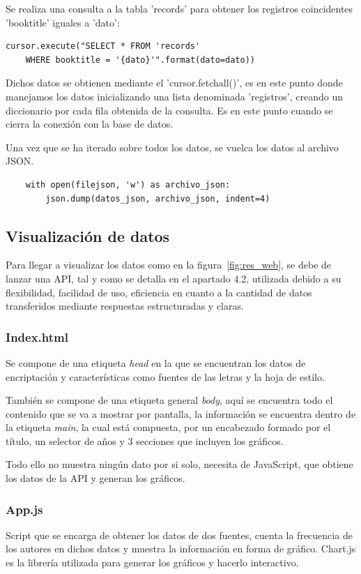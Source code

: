 \documentclass[a4paper, 12pt]{book}
\begin{document}
Se realiza una consulta a la tabla 'records' para obtener los registros coincidentes 'booktitle' iguales a 'dato':

\begin{verbatim}
cursor.execute("SELECT * FROM 'records' 
    WHERE booktitle = '{dato}'".format(dato=dato))
\end{verbatim}

Dichos datos se obtienen mediante el 'cursor.fetchall()', es en este punto donde manejamos los datos inicializando una lista denominada 'registros', creando un diccionario por cada fila obtenida de la consulta. Es en este punto cuando se cierra la conexión con la base de datos.

Una vez que se ha iterado sobre todos los datos, se vuelca los datos al archivo JSON.

\begin{verbatim}
    with open(filejson, 'w') as archivo_json:
        json.dump(datos_json, archivo_json, indent=4)
\end{verbatim}

\subsection{Visualización de datos}

Para llegar a visualizar los datos como en la figura~\ref{fig:res_web}, se debe de lanzar una API, tal y como se detalla en el apartado 4.2, utilizada debido a su flexibilidad, facilidad de uso, eficiencia en cuanto a la cantidad de datos transferidos mediante respuestas estructuradas y claras.

\subsubsection{Index.html}
Se compone de una etiqueta \textit{head} en la que se encuentran los datos de encriptación y características como fuentes de las letras y la hoja de estilo.

También se compone de una etiqueta general \textit{body}, aquí se encuentra todo el contenido que se va a mostrar por pantalla, la información se encuentra dentro de la etiqueta \textit{main}, la cual está compuesta, por un encabezado formado por el título, un selector de años y 3 secciones que incluyen los gráficos.

Todo ello no muestra ningún dato por si solo, necesita de JavaScript, que obtiene los datos de la API y generan los gráficos.

\subsubsection{App.js}
Script que se encarga de obtener los datos de dos fuentes, cuenta la frecuencia de los autores en dichos datos y muestra la información en forma de gráfico. Chart.js es la librería utilizada para generar los gráficos y hacerlo interactivo. 
\end{document}

